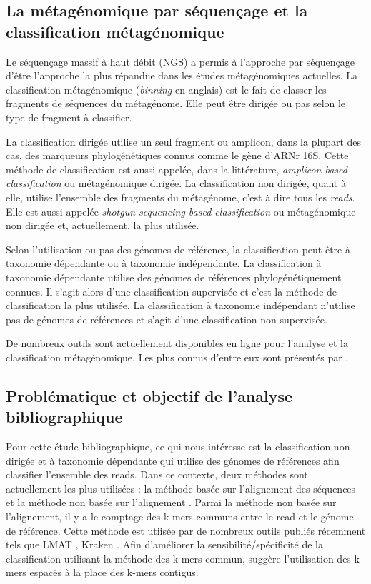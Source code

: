 \subsection{La métagénomique par séquençage et la classification métagénomique}

          Le séquençage massif à haut débit (NGS) a permis à l'approche par séquençage d'être l'approche la plus répandue dans les études métagénomiques actuelles.
          La classification métagénomique (\textit{binning} en anglais) est le fait de classer les fragments de séquences du métagénome. Elle peut être dirigée ou pas selon le type de fragment à classifier. 

          La classification dirigée utilise un seul fragment ou amplicon, dans la plupart des cas, des marqueurs phylogénétiques connus comme le gène d'ARNr 16S. Cette méthode de classification est aussi appelée, dans la littérature, \textit{amplicon-based classification} ou métagénomique dirigée.
          La classification non dirigée, quant à elle, utilise l'ensemble des fragments du métagénome, c'est à dire tous les \textit{reads}. Elle est aussi appelée \textit{shotgun sequencing-based classification} ou métagénomique non dirigée \cite{Mande2012} et, actuellement, la plus utilisée.

          Selon l'utilisation ou pas des génomes de référence, la classification peut être à taxonomie dépendante ou à taxonomie indépendante. 
          La classification à taxonomie dépendante utilise des génomes de références phylogénétiquement connues. Il s'agit alors d'une classification supervisée et c'est la méthode de classification la plus utilisée. 
          La classification à taxonomie indépendant n'utilise pas de génomes de références et s'agit d'une classification non supervisée. 
          
          De nombreux outils sont actuellement disponibles en ligne pour l'analyse et la classification métagénomique. Les plus connus d'entre eux sont présentés par \cite{Dudhagara2015}.
          

\subsection{Problématique et objectif de l'analyse bibliographique}
          
          Pour cette étude bibliographique, ce qui nous intéresse est la classification non dirigée et à taxonomie dépendante qui utilise des génomes de références afin classifier l'ensemble des reads.
          Dans ce contexte, deux méthodes sont actuellement les plus utilisées : la méthode basée sur l'alignement des séquences et la méthode non basée sur l'alignement \cite{Mande2012}. Parmi la méthode non basée sur l'alignement, il y a le comptage des k-mers communs entre le read et le génome de référence. Cette méthode est utiisée par de nombreux outils publiés récemment tels que LMAT \cite{Ames2013}, Kraken \cite{Wood2014}.
          Afin d'améliorer la sensibilité/spécificité de la classification utilisant la méthode des k-mers commun, \cite{Brinda2015} suggère l'utilisation des k-mers espacés à la place des k-mers contigus.
            
